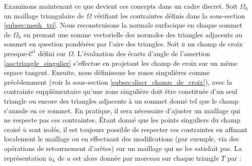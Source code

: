 Examinons maintenant ce que devient ces concepts dans un cadre discret. Soit $\Omega_h$ un maillage triangulaire de $\Omega$ vérifiant les contraintes définis dans la sous-section \ref{subsec:mesh_tri}. Nous reconstruisons la normale surfacique en chaque sommet de $\Omega_h$ en prenant une somme vectorielle des normales des triangles adjacents au sommet en question pondérées par l'aire des triangles. Soit $\bar{u}$ un champ de croix presque-$\mathcal{C}^1$ défini sur $\Omega$. L'évaluation des écarts d'angle de l'assertion \ref{ass:triangle_singulier} s'effectue en projetant les champ de croix sur un même espace tangent. Ensuite, nous définissons les zones singulières comme précédemment (voir la sous-section \ref{subsec:discr_champ_de_croix}), avec la contrainte supplémentaire qu'une zone singulière doit être constituée d'un seul triangle ou encore des triangles adjacents à un sommet donné tel que le champ s'annule en ce sommet. En pratique, il sera nécessaire d'ajuster un maillage qui ne respecte pas ces contraintes. Étant donné que les points singuliers du champ croisé $\bar{u}$ sont isolés, il est toujours possible de respecter ces contraintes en affinant localement le maillage ou en effectuant des modifications (par exemple, via des opérations de retournement d'arêtes) sur un maillage qui ne les satisfait pas. La représentation $\bar{u}_h$ de $u$ est alors donnée par morceau sur chaque triangle $T$ par :\\

